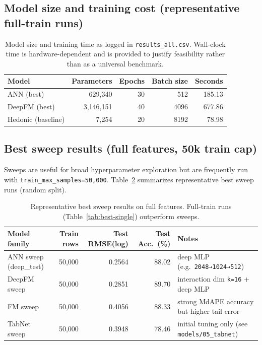 \documentclass[11pt]{article}
\newcommand{\BestAnnParams}{629{,}340}
\newcommand{\BestAnnSeconds}{185.13}
\newcommand{\BestDeepfmParams}{3{,}146{,}151}
\newcommand{\BestDeepfmSeconds}{677.86}
\newcommand{\BestHedParams}{7{,}254}
\newcommand{\BestHedSeconds}{78.98}
\begin{document}
\subsection{Model size and training cost (representative full-train runs)}
\begin{table}[h]
\centering
\small
\begin{tabular}{@{}lrrrr@{}}
\toprule
Model & Parameters & Epochs & Batch size & Seconds \\
\midrule
ANN (best) & \BestAnnParams & 30 & 512 & \BestAnnSeconds \\
DeepFM (best) & \BestDeepfmParams & 40 & 4096 & \BestDeepfmSeconds \\
Hedonic (baseline) & \BestHedParams & 20 & 8192 & \BestHedSeconds \\
\bottomrule
\end{tabular}
\caption{Model size and training time as logged in \texttt{results\_all.csv}. Wall-clock time is hardware-dependent and is provided to justify feasibility rather than as a universal benchmark.}
\label{tab:model-cost}
\end{table}

\subsection{Best sweep results (full features, 50k train cap)}
Sweeps are useful for broad hyperparameter exploration but are frequently run with \texttt{train\_max\_samples=50,000}. Table~\ref{tab:best-sweeps} summarizes representative best sweep runs (random split).

\begin{table}[h]
\centering
\small
\begin{tabular}{@{}lrrrl@{}}
\toprule
Model family & Train rows & Test RMSE(log) & Test Acc.\ (\%) & Notes \\
\midrule
ANN sweep (deep\_test) & 50{,}000 & 0.2564 & 88.02 & deep MLP (e.g.\ \texttt{2048→1024→512}) \\
DeepFM sweep & 50{,}000 & 0.2851 & 89.70 & interaction dim \texttt{k=16} + deep MLP \\
FM sweep & 50{,}000 & 0.4056 & 88.33 & strong MdAPE accuracy but higher tail error \\
TabNet sweep & 50{,}000 & 0.3948 & 78.46 & initial tuning only (see \texttt{models/05\_tabnet}) \\
\bottomrule
\end{tabular}
\caption{Representative best sweep results on full features. Full-train runs (Table~\ref{tab:best-single}) outperform sweeps.}
\label{tab:best-sweeps}
\end{table}
\end{document}
